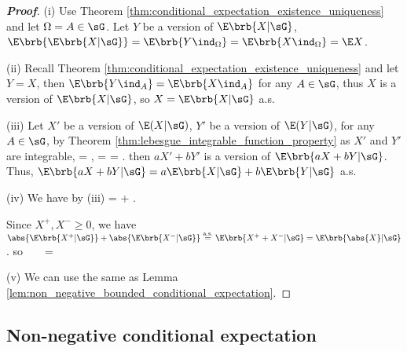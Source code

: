 \begin{proof}[\bf Proof]
\ben
\item [(i)] Use Theorem \ref{thm:conditional_expectation_existence_uniqueness} and let $\Omega = A\in \sG$. Let $Y$ be a version of $\E\brb{X|\sG}$, $\E\brb{\E\brb{X|\sG}} = \E \brb{Y\ind_\Omega} = \E\brb{X\ind_\Omega} = \E X$.

\item [(ii)] Recall Theorem \ref{thm:conditional_expectation_existence_uniqueness} and let $Y = X$, then $\E\brb{Y\ind_A} = \E\brb{X \ind_A}$ for any $A\in \sG$, thus $X$ is a version of $\E\brb{X|\sG}$, so $X = \E\brb{X|\sG}$ a.s.

\item [(iii)] Let $X'$ be a version of $\E(X|\sG)$, $Y'$ be a version of $\E(Y|\sG)$, for any $A\in \sG$, by Theorem \ref{thm:lebesgue_integrable_function_property} as $X'$ and $Y'$ are integrable,
\be
\E{} = \E{}, \quad \E{} = \E{} \quad\ra\quad \E{} = \E{}.
\ee
then $aX' + bY'$ is a version of $\E\brb{aX + bY|\sG}$. Thus, $\E\brb{aX + bY |\sG} = a\E\brb{X |\sG}+ b\E\brb{Y | \sG}$ a.s.

\item [(iv)] We have by (iii) %
\be
{} =    \leq {} + .
\ee

Since $X^+,X^- \geq 0$, we have $\abs{\E \brb{X^+|\sG}} + \abs{\E\brb{X^-|\sG}} \stackrel{\text{a.s.}}{=} \E\brb{X^+ + X^-|\sG} = \E\brb{\abs{X}|\sG}$. so \
\be
{} \leq \E{} \  \quad \ra \quad \E{} \leq \E{} = \E{} \quad {}
\ee

\item [(v)] We can use the same as Lemma \ref{lem:non_negative_bounded_conditional_expectation}.
\een
\end{proof}







\subsection{Non-negative conditional expectation}

